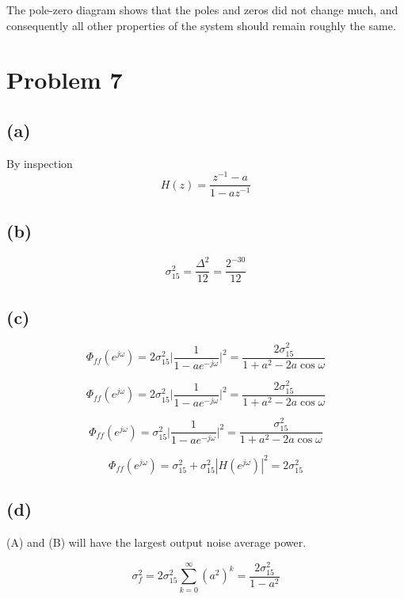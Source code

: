 \documentclass{article}
\begin{document}
The pole-zero diagram shows that the poles and zeros did not change much, and consequently all other properties of the system should remain roughly the same.

\section{Problem 7}

\subsection{(a)}
By inspection
\begin{equation}
	H(z) = \frac{z^{-1} - a}{1 - az^{-1}}
\end{equation}

\subsection{(b)}

\begin{equation}
\sigma_{15}^2 = \frac{\Delta^2}{12} = \frac{2^{-30}}{12}
\end{equation}

\begin{figure}[!h]
	\centering
	
\end{figure}

\subsection{(c)}

\begin{equation}
\Phi_{ff}(e^{j\omega}) = 2\sigma_{15}^2\bigg|\frac{1}{1-ae^{-j\omega}}\bigg|^2 = \frac{2\sigma_{15}^2}{1 + a^2 - 2a\cos\omega} \tag{(A)}
\end{equation}

\begin{equation}
\Phi_{ff}(e^{j\omega}) = 2\sigma_{15}^2\bigg|\frac{1}{1-ae^{-j\omega}}\bigg|^2 = \frac{2\sigma_{15}^2}{1 + a^2 - 2a\cos\omega} \tag{(B)}
\end{equation}

\begin{equation}
\Phi_{ff}(e^{j\omega}) = \sigma_{15}^2\bigg|\frac{1}{1-ae^{-j\omega}}\bigg|^2 = \frac{\sigma_{15}^2}{1 + a^2 - 2a\cos\omega} \tag{(C)}
\end{equation}

\begin{equation}
\Phi_{ff}(e^{j\omega}) = \sigma_{15}^2 + \sigma_{15}^2|H(e^{j\omega})|^2 = 2\sigma_{15}^2 \tag{(D)}
\end{equation}

\subsection{(d)}

(A) and (B) will have the largest output noise average power.

\begin{equation}
	\sigma_{f}^2 = 2\sigma_{15}^2\sum_{k = 0}^\infty (a^2)^k = \frac{2\sigma_{15}^2}{1 - a^2}
\end{equation}
\end{document}
